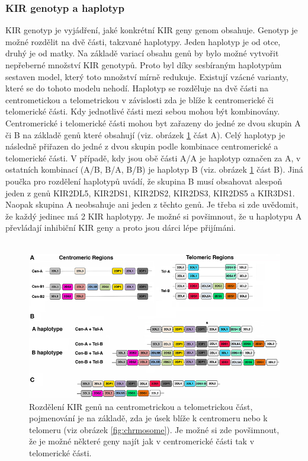 \documentclass[czech,DP]{thesiskiv}
\numberwithin{equation}{section}
\begin{document}
\subsubsection{KIR genotyp a haplotyp}
KIR genotyp je vyjádření, jaké konkrétní KIR geny genom obsahuje. Genotyp je možné rozdělit na dvě části, takzvané haplotypy. Jeden haplotyp je od otce, druhý je od matky. Na základě variací obsahu genů by bylo možné vytvořit nepřeberné množství KIR genotypů. Proto byl díky sesbíraným haplotypům sestaven model, který toto množství mírně redukuje. Existují vzácné varianty, které se do tohoto modelu nehodí. Haplotyp se rozděluje na dvě části na centrometickou a telometrickou v závislosti zda je blíže k centromerické či telomerické části. Kdy jednotlivé části mezi sebou mohou být kombinovány.  Centromerické i telomerické části mohou byt zařazeny do jedné ze dvou skupin A či B na základě genů které obsahují (viz. obrázek \ref{fig:kir_haplotypy_ct} část A). Celý haplotyp je následně přiřazen do jedné z dvou skupin podle kombinace centromerické a telomerické části. V případě, kdy jsou obě části A/A je haplotyp označen za A, v ostatních kombinací (A/B, B/A, B/B) je haplotyp B (viz. obrázek \ref{fig:kir_haplotypy_ct} část B). Jiná poučka pro rozdělení haplotypů uvádí, že skupina B musí obsahovat alespoň jeden z genů KIR2DL5, KIR2DS1, KIR2DS2, KIR2DS3, KIR2DS5 a KIR3DS1. Naopak skupina A neobsahuje ani jeden z těchto genů. Je třeba si zde uvědomit, že každý jedinec má 2 KIR haplotypy. Je možné si povšimnout, že u haplotypu A převládají inhibiční KIR geny a proto jsou dárci lépe přijímáni. \cite{KIR_haplotypy_ct}
\\
\\
\begin{figure}[H]		
		\centering
		\includegraphics[width=\textwidth]{./img/KIR_haplotype.jpg}
		\caption{Rozdělení KIR genů na centrometrickou a telometrickou část, pojmenování je na základě, zda je úsek blíže k centromeru nebo k telomeru (viz obrázek \ref{fig:chrmosome}). Je možné si zde povšimnout, že je možné některé geny najít jak v centromerické části tak v telomerické části. \cite{KIR_haplotypy_ct}}
		\label{fig:kir_haplotypy_ct}
\end{figure}
\end{document}
